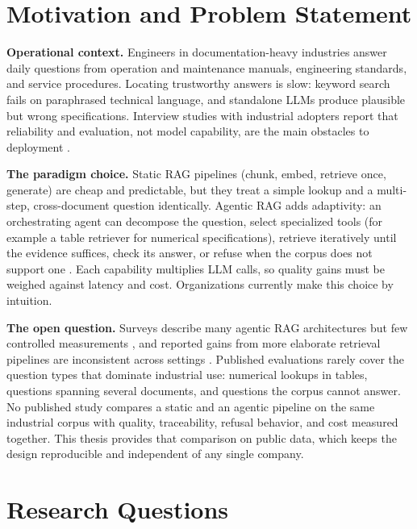 \documentclass[10pt,a4paper]{article}
\begin{document}
\section{Motivation and Problem Statement}

\textbf{Operational context.} Engineers in documentation-heavy industries answer daily questions from operation and maintenance manuals, engineering standards, and service procedures. Locating trustworthy answers is slow: keyword search fails on paraphrased technical language, and standalone LLMs produce plausible but wrong specifications. Interview studies with industrial adopters report that reliability and evaluation, not model capability, are the main obstacles to deployment \cite{ragindustry2025}.

\textbf{The paradigm choice.} Static RAG pipelines (chunk, embed, retrieve once, generate) are cheap and predictable, but they treat a simple lookup and a multi-step, cross-document question identically. Agentic RAG adds adaptivity: an orchestrating agent can decompose the question, select specialized tools (for example a table retriever for numerical specifications), retrieve iteratively until the evidence suffices, check its answer, or refuse when the corpus does not support one \cite{yao2023react, singh2025agentic}. Each capability multiplies LLM calls, so quality gains must be weighed against latency and cost. Organizations currently make this choice by intuition.

\textbf{The open question.} Surveys describe many agentic RAG architectures but few controlled measurements \cite{singh2025agentic}, and reported gains from more elaborate retrieval pipelines are inconsistent across settings \cite{gao2024survey}. Published evaluations rarely cover the question types that dominate industrial use: numerical lookups in tables, questions spanning several documents, and questions the corpus cannot answer. No published study compares a static and an agentic pipeline on the same industrial corpus with quality, traceability, refusal behavior, and cost measured together. This thesis provides that comparison on public data, which keeps the design reproducible and independent of any single company.

\section{Research Questions}
\end{document}
